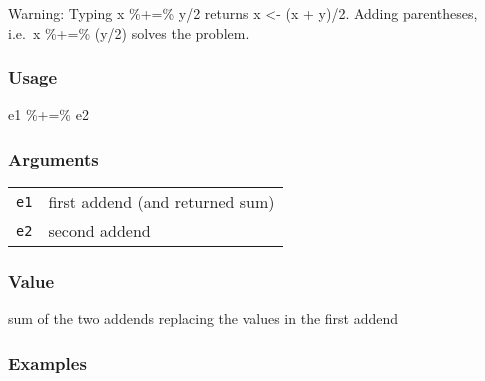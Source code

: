\documentclass[
  letterpaper,
  DIV=11,
  numbers=noendperiod]{scrreport}
\newenvironment{Shaded}{\begin{snugshade}}{\end{snugshade}}
\newcommand{\DecValTok}[1]{\textcolor[rgb]{0.68,0.00,0.00}{#1}}
\newcommand{\DocumentationTok}[1]{\textcolor[rgb]{0.37,0.37,0.37}{\textit{#1}}}
\newcommand{\FloatTok}[1]{\textcolor[rgb]{0.68,0.00,0.00}{#1}}
\newcommand{\FunctionTok}[1]{\textcolor[rgb]{0.28,0.35,0.67}{#1}}
\newcommand{\NormalTok}[1]{\textcolor[rgb]{0.00,0.23,0.31}{#1}}
\newcommand{\OtherTok}[1]{\textcolor[rgb]{0.00,0.23,0.31}{#1}}
\newcommand{\SpecialCharTok}[1]{\textcolor[rgb]{0.37,0.37,0.37}{#1}}
\begin{document}
Warning: Typing x \%+=\% y/2 returns x \textless- (x + y)/2. Adding
parentheses, i.e.~x \%+=\% (y/2) solves the problem.

\subsubsection{Usage}\label{usage-49}

\begin{Shaded}
\begin{Highlighting}[]
\NormalTok{e1 }\SpecialCharTok{\%+=\%}\NormalTok{ e2}
\end{Highlighting}
\end{Shaded}

\subsubsection{Arguments}\label{arguments-49}

\begin{longtable}[]{@{}ll@{}}
\toprule\noalign{}
\endhead
\bottomrule\noalign{}
\endlastfoot
\texttt{e1} & first addend (and returned sum) \\
\texttt{e2} & second addend \\
\end{longtable}

\subsubsection{Value}\label{value-49}

sum of the two addends replacing the values in the first addend

\subsubsection{Examples}\label{examples-49}

\begin{Shaded}
\end{Shaded}
\end{document}
